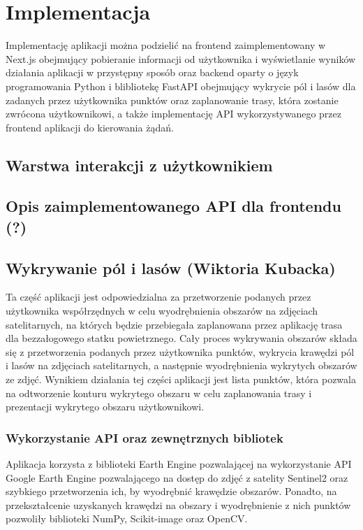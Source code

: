\chapter{Implementacja}
\label{chap:project implementation}
Implementację aplikacji można podzielić na frontend zaimplementowany w Next.js obejmujący pobieranie informacji od użytkownika i wyświetlanie wyników działania aplikacji w przystępny sposób oraz backend oparty o język programowania Python i blibliotekę FastAPI obejmujący wykrycie pól i lasów dla zadanych przez użytkownika punktów oraz zaplanowanie trasy, która zostanie zwrócona użytkownikowi, a także implementację API wykorzystywanego przez frontend aplikacji do kierowania żądań.

\section{Warstwa interakcji z użytkownikiem}

\section{Opis zaimplementowanego API dla frontendu (?)}

\section{Wykrywanie pól i lasów (Wiktoria Kubacka)}
Ta część aplikacji jest odpowiedzialna za przetworzenie podanych przez użytkownika współrzędnych w celu wyodrębnienia obszarów na zdjęciach satelitarnych, na których będzie przebiegała zaplanowana przez aplikację trasa dla bezzałogowego statku powietrznego. Cały proces wykrywania obszarów składa się z przetworzenia podanych przez użytkownika punktów, wykrycia krawędzi pól i lasów na zdjęciach satelitarnych, a następnie wyodrębnienia wykrytych obszarów ze zdjęć. Wynikiem działania tej części aplikacji jest lista punktów, która pozwala na odtworzenie konturu wykrytego obszaru w celu zaplanowania trasy i prezentacji wykrytego obszaru użytkownikowi.

\subsection{Wykorzystanie API oraz zewnętrznych bibliotek}
Aplikacja korzysta z biblioteki Earth Engine pozwalającej na wykorzystanie API Google Earth Engine pozwalającego na dostęp do zdjęć z satelity Sentinel2 oraz szybkiego przetworzenia ich, by wyodrębnić krawędzie obszarów. Ponadto, na przekształcenie uzyskanych krawędzi na obszary i wyodrębnienie z nich punktów pozwoliły biblioteki NumPy, Scikit-image oraz OpenCV.  

